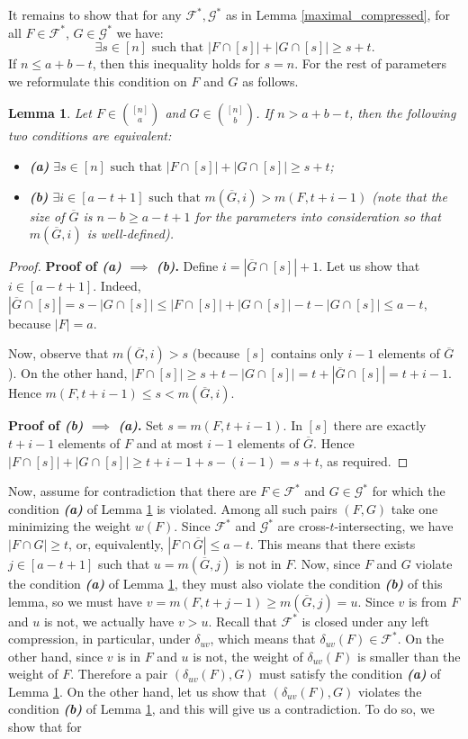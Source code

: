 \documentclass[12pt]{article}
\let\leq\leqslant
\let\geq\geqslant
\let\le\leq
\let\ge\geq
\def\F{{\mathcal F}}
\def\G{{\mathcal G}}
\newtheorem{lemma}[theorem]{Lemma}
\begin{document}
It remains to show that for any $\F^*, \G^*$ as in Lemma \ref{maximal_compressed}, for all $F\in\F^*$, $G\in \G^*$ we have:
$$\exists s\in [n]  \mbox{ such that } |F\cap[s]| + |G\cap[s]| \ge s + t.$$
If $n\leq a+b-t$, then this inequality holds for $s=n$. For the rest of parameters we reformulate  this condition on $F$ and $G$  as follows.
\begin{lemma}
\label{eq_border}
Let $F\in\binom{[n]}{a}$ and $G\in\binom{[n]}{b}$. 
If $n> a+b-t$, then the following two conditions are equivalent:
\begin{itemize}
\item \textbf{(a)}  $\exists s\in [n]  \mbox{ such that } |F\cap[s]| + |G\cap[s]| \ge s + t$;
\item \textbf{(b)} $\exists i \in [a - t + 1] \mbox{ such that } m(\overline{G}, i) > m(F, t + i - 1)$ 
(note that the size of $\overline{G}$ is $n - b \ge a - t + 1$ for  the parameters into consideration so that $m(\overline{G}, i)$ is well-defined).
\end{itemize}
\end{lemma}
\begin{proof}
\textbf{Proof of \emph{(a)} $\implies$ \emph{(b)}.} Define $i = |\overline{G}\cap [s]| + 1$. Let us show that $i\in [a - t + 1]$. Indeed, $|\overline{G}\cap [s]| = s - |G\cap [s]| \le |F\cap[s]| + |G\cap[s]| - t -  |G\cap [s]| \le a - t$, because $|F| = a$.

 Now, observe that $m(\overline{G}, i) > s$ (because $[s]$ contains only $i - 1$ elements of $\overline{G}$). On the other hand, $|F\cap[s]| \ge s + t - |G\cap[s]| = t + |\overline{G}\cap [s]| = t + i - 1$. Hence $m(F, t + i - 1) \le s < m(\overline{G}, i)$.

\textbf{Proof of \emph{(b)} $\implies$ \emph{(a)}.}
Set $s= m(F, t + i - 1)$. In $[s]$ there are exactly $t + i - 1$ elements of $F$ and at most $i - 1$ elements of $\overline{G}$. Hence $|F\cap[s]| + |G\cap[s]| \ge t + i - 1 + s - (i - 1) = s + t$, as required.
\end{proof}
Now, assume for contradiction that there are $F\in\F^*$ and $G\in \G^*$ for which the condition \textbf{\emph{(a)}} of Lemma \ref{eq_border} is violated. Among all such pairs $(F, G)$ take one minimizing the weight $w(F)$.
 Since $\F^*$ and $\G^*$ are cross-$t$-intersecting, we have $|F\cap G| \ge t$, or, equivalently, $|F\cap\overline{G}| \le a - t$. This means that there exists $j\in [a - t + 1]$ such that $u = m(\overline{G}, j)$ is not in $F$. Now, since $F$ and $G$ violate the condition \textbf{\emph{(a)}} of Lemma \ref{eq_border}, they must also violate the condition  \textbf{\emph{(b)}} of this lemma, so we must have $ v = m(F, t + j - 1) \ge m(\overline{G}, j) = u$. Since $v$ is from $F$ and $u$ is not, we actually have $v > u$. Recall that $\F^*$ is closed under any left compression, in particular, under $\delta_{uv}$, which means that $\delta_{uv}(F) \in \F^*$.  On the other hand, since $v$ is in $F$ and $u$ is not, the weight of $\delta_{uv}(F)$ is smaller than the weight of $F$. Therefore a pair $(\delta_{uv}(F), G)$ must satisfy the condition \textbf{\emph{(a)}} of Lemma \ref{eq_border}. On the other hand, let us show that $(\delta_{uv}(F), G)$ violates the condition \textbf{\emph{(b)}} of Lemma \ref{eq_border}, and this will give us a contradiction. To do so, we show that for
\end{document}

